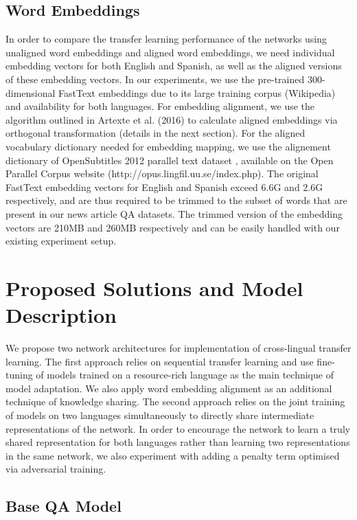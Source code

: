 \documentclass[]{article}
\begin{document}
\subsection{Word Embeddings}

In order to compare the transfer learning performance of the networks using unaligned word embeddings and aligned word embeddings, we need individual embedding vectors for both English and Spanish, as well as the aligned versions of these embedding vectors. In our experiments, we use the pre-trained 300-dimensional FastText embeddings \cite{bojanowski2016enriching} due to its large training corpus (Wikipedia) and availability for both languages. For embedding alignment, we use the algorithm outlined in Artexte et al. (2016) \cite{artetxe2016learning} to calculate aligned embeddings via orthogonal transformation (details in the next section). For the aligned vocabulary dictionary needed for embedding mapping, we use the alignement dictionary of OpenSubtitles 2012 parallel text dataset \cite{TIEDEMANN12.463}, available on the Open Parallel Corpus website (http://opus.lingfil.uu.se/index.php). The original FastText embedding vectors for English and Spanish exceed 6.6G and 2.6G respectively, and are thus required to be trimmed to the subset of words that are present in our news article QA datasets. The trimmed version of the embedding vectors are 210MB and 260MB respectively and can be easily handled with our existing experiment setup.



\section{Proposed Solutions and Model Description}

We propose two network architectures for implementation of cross-lingual transfer learning. The first approach relies on sequential transfer learning and use fine-tuning of models trained on a resource-rich language as the main technique of model adaptation. We also apply word embedding alignment as an additional technique of knowledge sharing. The second approach relies on the joint training of models on two languages simultaneously to directly share intermediate representations of the network. In order to encourage the network to learn a truly shared representation for both languages rather than learning two representations in the same network, we also experiment with adding a penalty term optimised via adversarial training.

\subsection{Base QA Model}
\end{document}

